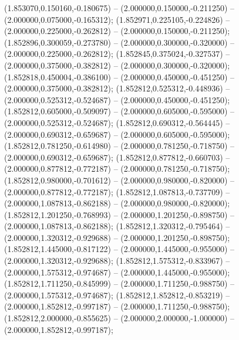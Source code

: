  (1.853070,0.150160,-0.180675) -- (2.000000,0.150000,-0.211250) -- (2.000000,0.075000,-0.165312);
 (1.852971,0.225105,-0.224826) -- (2.000000,0.225000,-0.262812) -- (2.000000,0.150000,-0.211250);
 (1.852896,0.300059,-0.273780) -- (2.000000,0.300000,-0.320000) -- (2.000000,0.225000,-0.262812);
 (1.852845,0.375024,-0.327537) -- (2.000000,0.375000,-0.382812) -- (2.000000,0.300000,-0.320000);
 (1.852818,0.450004,-0.386100) -- (2.000000,0.450000,-0.451250) -- (2.000000,0.375000,-0.382812);
 (1.852812,0.525312,-0.448936) -- (2.000000,0.525312,-0.524687) -- (2.000000,0.450000,-0.451250);
 (1.852812,0.605000,-0.509097) -- (2.000000,0.605000,-0.595000) -- (2.000000,0.525312,-0.524687);
 (1.852812,0.690312,-0.564445) -- (2.000000,0.690312,-0.659687) -- (2.000000,0.605000,-0.595000);
 (1.852812,0.781250,-0.614980) -- (2.000000,0.781250,-0.718750) -- (2.000000,0.690312,-0.659687);
 (1.852812,0.877812,-0.660703) -- (2.000000,0.877812,-0.772187) -- (2.000000,0.781250,-0.718750);
 (1.852812,0.980000,-0.701612) -- (2.000000,0.980000,-0.820000) -- (2.000000,0.877812,-0.772187);
 (1.852812,1.087813,-0.737709) -- (2.000000,1.087813,-0.862188) -- (2.000000,0.980000,-0.820000);
 (1.852812,1.201250,-0.768993) -- (2.000000,1.201250,-0.898750) -- (2.000000,1.087813,-0.862188);
 (1.852812,1.320312,-0.795464) -- (2.000000,1.320312,-0.929688) -- (2.000000,1.201250,-0.898750);
 (1.852812,1.445000,-0.817122) -- (2.000000,1.445000,-0.955000) -- (2.000000,1.320312,-0.929688);
 (1.852812,1.575312,-0.833967) -- (2.000000,1.575312,-0.974687) -- (2.000000,1.445000,-0.955000);
 (1.852812,1.711250,-0.845999) -- (2.000000,1.711250,-0.988750) -- (2.000000,1.575312,-0.974687);
 (1.852812,1.852812,-0.853219) -- (2.000000,1.852812,-0.997187) -- (2.000000,1.711250,-0.988750);
 (1.852812,2.000000,-0.855625) -- (2.000000,2.000000,-1.000000) -- (2.000000,1.852812,-0.997187);
